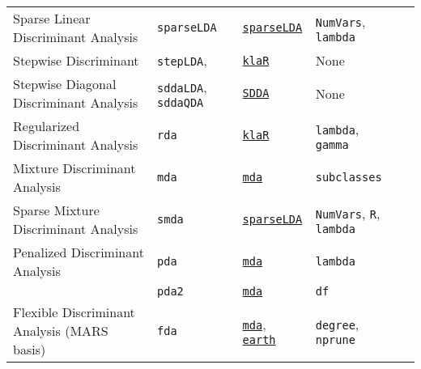 \documentclass[12pt]{article}
\begin{document}
\begin{landscape}
\begin{longtable}{lllll}
      Sparse Linear Discriminant Analysis&
         \texttt{sparseLDA} & 
              {\tt \href{http://cran.r-project.org/web/packages/sparseLDA/index.html}{sparseLDA}}      &          
            \texttt{NumVars}, \texttt{lambda} \\  

\rowcolor[rgb]{.95, .95, .95}               
       Stepwise Discriminant&
        \texttt{stepLDA}, &
         {\tt \href{http://cran.r-project.org/web/packages/klaR/index.html}{klaR}}   &
        None \\
      
      Stepwise Diagonal Discriminant Analysis&
        \texttt{sddaLDA}, \texttt{sddaQDA}&
         {\tt \href{http://cran.r-project.org/web/packages/SDDA/index.html}{SDDA}}&
        None \\
            
\rowcolor[rgb]{.95, .95, .95}                     
      Regularized Discriminant Analysis &
         \texttt{rda} & 
             {\tt \href{http://cran.r-project.org/web/packages/klaR/index.html}{klaR}}      & 
            \texttt{lambda}, \texttt{gamma} & \\
      
      Mixture Discriminant Analysis &
         \texttt{mda} & 
             {\tt \href{http://cran.r-project.org/web/packages/mda/index.html}{mda}}        & 
            \texttt{subclasses} & \\

\rowcolor[rgb]{.95, .95, .95}         
      Sparse Mixture Discriminant Analysis&
         \texttt{smda} & 
             {\tt \href{http://cran.r-project.org/web/packages/sparseLDA/index.html}{sparseLDA}}        &          
            \texttt{NumVars}, \texttt{R}, \texttt{lambda} \\  
      
      Penalized Discriminant Analysis &
         \texttt{pda} & 
             {\tt \href{http://cran.r-project.org/web/packages/mda/index.html}{mda}}      & 
            \texttt{lambda} & \\
 
        & \texttt{pda2} & 
             {\tt \href{http://cran.r-project.org/web/packages/mda/index.html}{mda}}       & 
            \texttt{df} & \\     
 
 \rowcolor[rgb]{.95, .95, .95}              
      Flexible Discriminant Analysis (MARS basis) &
         \texttt{fda} & 
             {\tt \href{http://cran.r-project.org/web/packages/mda/index.html}{mda}},  {\tt \href{http://cran.r-project.org/web/packages/earth/index.html}{earth}}       & 
            \texttt{degree}, \texttt{nprune} & \\
      

\end{longtable}
\end{landscape}
\end{document}

